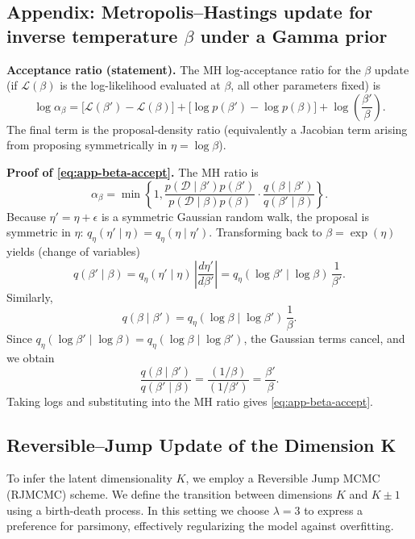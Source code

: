 \documentclass{article}
\theoremstyle{plain}
\theoremstyle{definition}
\theoremstyle{remark}
\begin{document}
\subsection{Appendix: Metropolis--Hastings update for inverse temperature $\beta$ under a Gamma prior}
\label{app:beta-gamma-mh}

\noindent \textbf{Acceptance ratio (statement).}
The MH log-acceptance ratio for the $\beta$ update (if $\mathcal{L}(\beta)$ is the log-likelihood evaluated at $\beta$, all other parameters fixed) is
\begin{equation}
\log \alpha_\beta
=
\Big[\mathcal{L}(\beta')-\mathcal{L}(\beta)\Big]
+
\Big[\log p(\beta')-\log p(\beta)\Big]
+
\log\!\left(\frac{\beta'}{\beta}\right).
\label{eq:app-beta-accept}
\end{equation}
The final term is the proposal-density ratio (equivalently a Jacobian term arising from proposing
symmetrically in $\eta=\log\beta$).

\noindent \textbf{Proof of \eqref{eq:app-beta-accept}.}
The MH ratio is
\[
\alpha_\beta
=
\min\left\{1,
\frac{p(\mathcal{D}\mid\beta')p(\beta')}{p(\mathcal{D}\mid\beta)p(\beta)}
\cdot
\frac{q(\beta\mid\beta')}{q(\beta'\mid\beta)}
\right\}.
\]
Because $\eta'=\eta+\epsilon$ is a symmetric Gaussian random walk, the proposal is symmetric in
$\eta$:
$q_\eta(\eta'\mid\eta)=q_\eta(\eta\mid\eta')$.
Transforming back to $\beta=\exp(\eta)$ yields (change of variables)
\[
q(\beta'\mid\beta)
=
q_\eta(\eta'\mid\eta)\,\left|\frac{d\eta'}{d\beta'}\right|
=
q_\eta(\log\beta'\mid\log\beta)\,\frac{1}{\beta'}.
\]
Similarly,
\[
q(\beta\mid\beta')
=
q_\eta(\log\beta\mid\log\beta')\,\frac{1}{\beta}.
\]
Since $q_\eta(\log\beta'\mid\log\beta)=q_\eta(\log\beta\mid\log\beta')$, the Gaussian terms cancel,
and we obtain
\[
\frac{q(\beta\mid\beta')}{q(\beta'\mid\beta)}
=
\frac{(1/\beta)}{(1/\beta')}
=
\frac{\beta'}{\beta}.
\]
Taking logs and substituting into the MH ratio gives \eqref{eq:app-beta-accept}.


\subsection{Reversible--Jump Update of the Dimension K}
\label{subsec:K-update}

To infer the latent dimensionality $K$, we employ a Reversible Jump MCMC (RJMCMC) scheme. We define the transition between dimensions $K$ and $K \pm 1$ using a birth-death process. In this setting we choose $\lambda=3$ to express a preference for parsimony, effectively regularizing the model against overfitting.
\end{document}
